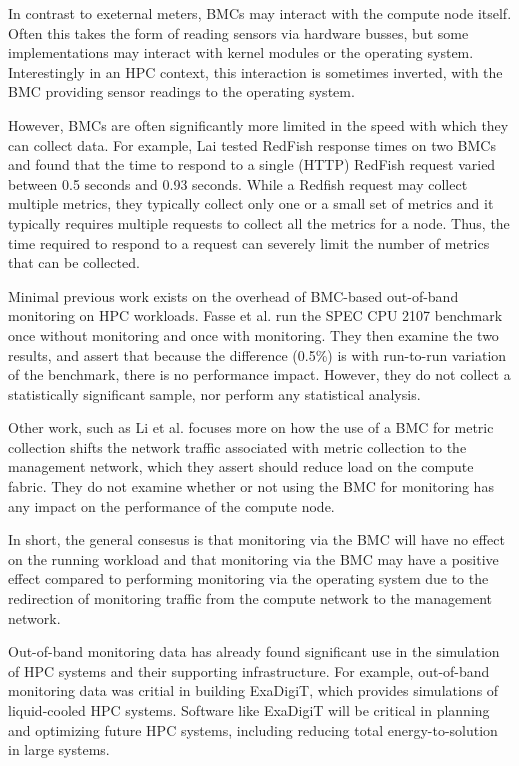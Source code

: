 \documentclass[conference]{IEEEtran}
\begin{document}
In contrast to exeternal meters, BMCs may interact with the compute node itself. 
Often this takes the form of reading sensors via hardware busses, but some implementations may 
interact with kernel modules or the operating system\cite{IDRACServiceModule}. 
Interestingly in an HPC context, this interaction is sometimes inverted, with 
the BMC providing sensor readings to the operating system\cite{enterpriseUserAccessCompute,martinCrayXC30Power}.

However, BMCs are often significantly more limited in the speed with which they 
can collect data. For example, Lai\cite{laiBenchmarkingBMCs} tested RedFish 
response times on two BMCs and found that the time to respond to a single 
(HTTP) RedFish request varied between 0.5 seconds and 0.93 seconds. While a 
Redfish request may collect multiple metrics, they typically collect only one or 
a small set of metrics and it typically requires multiple 
requests to collect all the metrics for a node. Thus, the time required to respond to a 
request can severely limit the number of metrics that can be collected.

Minimal previous work exists on the overhead of BMC-based out-of-band monitoring on HPC 
workloads. Fasse et al.\cite{faasseOutBandPerformance2020} run 
the SPEC CPU 2107 benchmark once without monitoring and once with monitoring. 
They then examine the two results, and 
assert that because the difference (0.5\%) is with run-to-run variation of the 
benchmark, there is no performance impact. However, they do not collect a 
statistically significant sample, nor perform any statistical analysis.

Other work, such as Li et al.
\cite{liMonSTerOutoftheBoxMonitoring2020}
focuses more on how the use of a BMC for metric collection shifts the network 
traffic associated with metric collection to the management network, which 
they assert should reduce load on the compute fabric. They do not examine 
whether or not using the BMC for monitoring has any impact on the performance 
of the compute node.

In short, the general consesus is that monitoring via the BMC will have no 
effect on the running workload and that monitoring via the BMC may have a 
positive effect compared to performing monitoring via the operating system due 
to the redirection of monitoring traffic from the compute network to the 
management network.

Out-of-band monitoring data has already found significant use in the simulation 
of HPC systems and their supporting infrastructure. For example, out-of-band 
monitoring data was critial in building 
ExaDigiT\cite{brewerDigitalTwinFramework2024}, which provides simulations of 
liquid-cooled HPC systems. Software like ExaDigiT will be critical in planning
and optimizing future HPC systems, including reducing total energy-to-solution 
in large systems.
\end{document}
